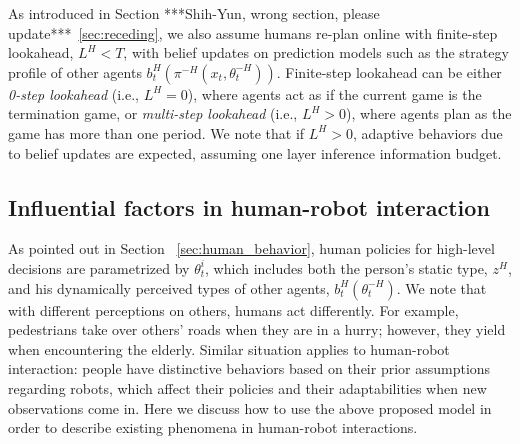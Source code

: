 \documentclass[letterpaper, 10 pt, conference]{ieeeconf}  %
\begin{document}
As introduced in Section ***Shih-Yun, wrong section, please update***~\ref{sec:receding}, we also assume humans re-plan 
online with finite-step lookahead, $L^H<T$, with belief updates on prediction 
models such as the strategy profile of other agents 
$b^H_t(\pi^{-H}(x_t,\theta^{-H}_t))$. Finite-step lookahead can be either 
\textit{0-step lookahead} (i.e., $L^H=0$), where agents act as if the current 
game is the termination game, or \textit{multi-step lookahead} (i.e., $L^H>0$), 
where agents plan as the game has more than one period. We note that if $L^H>0$, 
adaptive behaviors due to belief updates are expected, assuming one layer inference information budget.




\subsection{Influential factors in human-robot interaction}
As pointed out in Section ~\ref{sec:human_behavior}, human policies for high-level decisions are parametrized by $\theta^i_t$, which includes both the person's static type, $z^H$, and his dynamically perceived types of other agents, $b^H_t(\theta^{-H}_t)$. We note that with different perceptions on others, humans act differently. For example, pedestrians take over others' roads when they are in a hurry; however, they yield when encountering the elderly. Similar situation 
applies to human-robot interaction: people have distinctive behaviors based on their prior assumptions regarding robots, which affect their policies and their adaptabilities when new observations come in. Here we discuss how to use the above proposed model in order to describe	 existing phenomena in human-robot interactions. 
\end{document}
